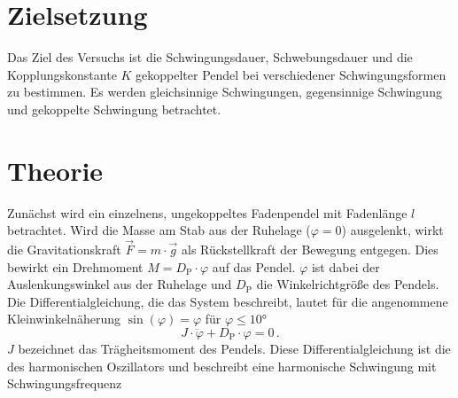\section{Zielsetzung}
\label{sec:Zielsetzung}
Das Ziel des Versuchs ist die Schwingungsdauer, Schwebungsdauer und die Kopplungskonstante $K$ gekoppelter Pendel bei verschiedener Schwingungsformen zu bestimmen. 
Es werden gleichsinnige Schwingungen, gegensinnige Schwingung und gekoppelte Schwingung betrachtet.  

\section{Theorie}
\label{sec:Theorie}
Zunächst wird ein einzelnens, ungekoppeltes Fadenpendel mit Fadenlänge $l$ betrachtet. 
Wird die Masse am Stab aus der Ruhelage ($\varphi = 0$) ausgelenkt, wirkt 
die Gravitationskraft $\vec{F} = m \cdot \vec{g}$ als Rückstellkraft der Bewegung entgegen. Dies bewirkt ein Drehmoment 
$M = D_{\text{P}} \cdot \varphi$ auf das Pendel. $\varphi$ ist dabei der Auslenkungswinkel aus der Ruhelage und $D_{\text{P}}$ die 
Winkelrichtgröße des Pendels. Die Differentialgleichung, die das System beschreibt, lautet für die angenommene Kleinwinkelnäherung 
$\sin(\varphi) = \varphi$ für $\varphi \leq 10°$
\begin{equation*}
    J \cdot \ddot{\varphi} + D_{\text{P}} \cdot \varphi = 0\,.
\end{equation*}
$J$ bezeichnet das Trägheitsmoment des Pendels. Diese Differentialgleichung ist die des harmonischen Oszillators und beschreibt eine harmonische Schwingung 
mit Schwingungsfrequenz 

